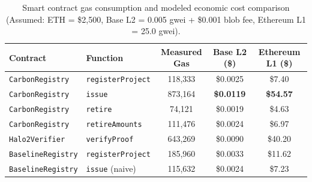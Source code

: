 \begin{table}[t]
\centering
\small
\caption{Smart contract gas consumption and modeled economic cost comparison (Assumed: ETH = \$2,500, Base L2 = 0.005 gwei + \$0.001 blob fee, Ethereum L1 = 25.0 gwei).}
\label{tab:gas_costs}
\begin{tabular}{llccc}
\hline
\textbf{Contract} & \textbf{Function} & \textbf{Measured Gas} & \textbf{Base L2 (\$)} & \textbf{Ethereum L1 (\$)} \\
\hline
\texttt{CarbonRegistry} & \texttt{registerProject} & 118,333 & \$0.0025 & \$7.40 \\
\texttt{CarbonRegistry} & \texttt{issue} & 873,164 & \textbf{\$0.0119} & \textbf{\$54.57} \\
\texttt{CarbonRegistry} & \texttt{retire} & 74,121 & \$0.0019 & \$4.63 \\
\texttt{CarbonRegistry} & \texttt{retireAmounts} & 111,476 & \$0.0024 & \$6.97 \\
\texttt{Halo2Verifier} & \texttt{verifyProof} & 643,269 & \$0.0090 & \$40.20 \\
\hline
\texttt{BaselineRegistry} & \texttt{registerProject} & 185,960 & \$0.0033 & \$11.62 \\
\texttt{BaselineRegistry} & \texttt{issue} (naive) & 115,632 & \$0.0024 & \$7.23 \\
\hline
\end{tabular}
\end{table}

